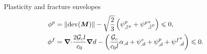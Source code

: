 \begin{frame}
  \small
  \vspace{-2em}
  \begin{block}{Plasticity and fracture envelopes}
    \vspace{-1em}
    \begin{align*}
      \phi^p & = \norm{\dev(\bfM)} - \sqrt{\dfrac{2}{3}} \left( \psi^p_{,\ep} + {\psi^p}^*_{,\epdot} \right) \leqslant 0,                                                \\
      \phi^f & = \divergence \dfrac{2\Gc l}{c_0} \grad d - \left( \dfrac{\Gc}{c_0 l}\alpha_{,d} + \psi^e_{,d} + \psi^p_{,d} + {\psi^f}^*_{,\dot{d}} \right) \leqslant 0. 
    \end{align*}
  \end{block}
  
  \begin{overlayarea}{\textwidth}{0.4\textwidth}
\end{overlayarea}
\end{frame}
